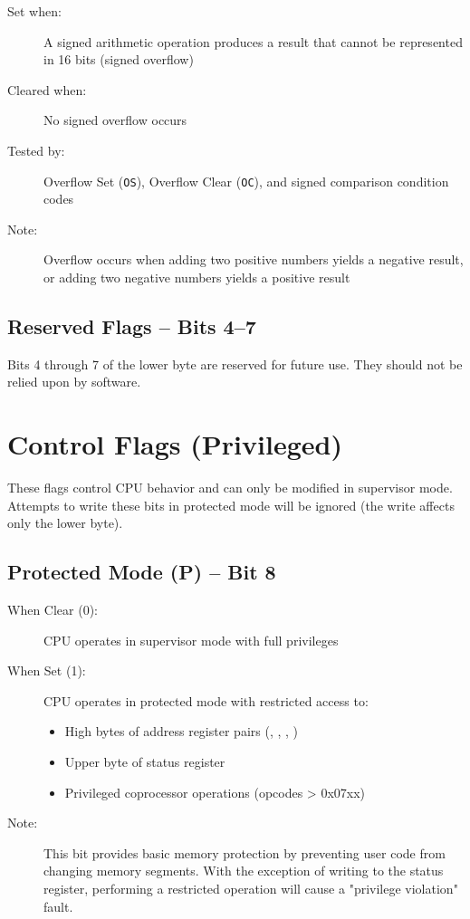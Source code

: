 \begin{description}
	\item[Set when:] A signed arithmetic operation produces a result that cannot be represented in 16 bits (signed overflow)
	\item[Cleared when:] No signed overflow occurs
	\item[Tested by:] Overflow Set (\texttt{OS}), Overflow Clear (\texttt{OC}), and signed comparison condition codes
	\item[Note:] Overflow occurs when adding two positive numbers yields a negative result, or adding two negative numbers yields
	      a positive result
\end{description}

\subsection{Reserved Flags -- Bits 4--7}

Bits 4 through 7 of the lower byte are reserved for future use. They should not be relied upon by software.

\section{Control Flags (Privileged)}

These flags control CPU behavior and can only be modified in supervisor mode. Attempts to write these bits in protected
mode will be ignored (the write affects only the lower byte).

\subsection{Protected Mode (P) -- Bit 8}

\begin{description}
	\item[When Clear (0):] CPU operates in supervisor mode with full privileges
	\item[When Set (1):] CPU operates in protected mode with restricted access to:
	      \begin{itemize}
		      \item High bytes of address register pairs (, , , )
		      \item Upper byte of status register
		      \item Privileged coprocessor operations (opcodes > 0x07xx)
	      \end{itemize}
	\item[Note:] This bit provides basic memory protection by preventing user code from changing memory segments. With the
	      exception of writing to the status register, performing a restricted operation will cause a "privilege violation"
	      fault.
\end{description}

